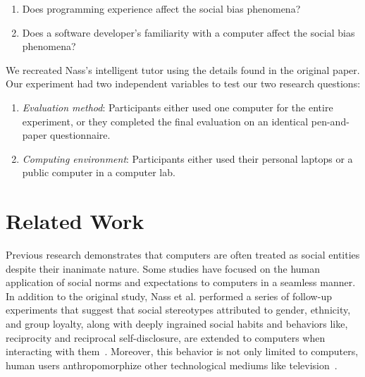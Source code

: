 \documentclass{sig-alternate-05-2015}
\begin{document}
\begin{enumerate}
    \item{Does programming experience affect the social bias phenomena?}
    \item{Does a software developer's familiarity with a computer affect the social bias phenomena? } 
\end{enumerate}

We recreated Nass's intelligent tutor using the details found in the original paper.  Our experiment had two independent variables to test our two research questions:
\begin{enumerate}
    \item {\textit{Evaluation method}: Participants either used one computer for the entire experiment, or they completed the final evaluation on an identical pen-and-paper questionnaire.}
    \item {\textit{Computing environment}: Participants either used their personal laptops or a public computer in a computer lab.}
\end{enumerate}

\section{Related Work}
Previous research demonstrates that computers are often treated as social entities despite their inanimate nature. Some studies have focused on the human application of social norms and expectations to computers in a seamless manner. In addition to the original study, Nass et al. performed a series of follow-up experiments that suggest that social stereotypes attributed to gender, ethnicity, and group loyalty, along with deeply ingrained social habits and behaviors like, reciprocity and reciprocal self-disclosure, are extended to computers when interacting with them~\cite{Nass2000machines,nass1999people}. Moreover, this behavior is not only limited to computers, human users anthropomorphize other technological mediums like television~\cite{reeves1996people}.

\end{document}
